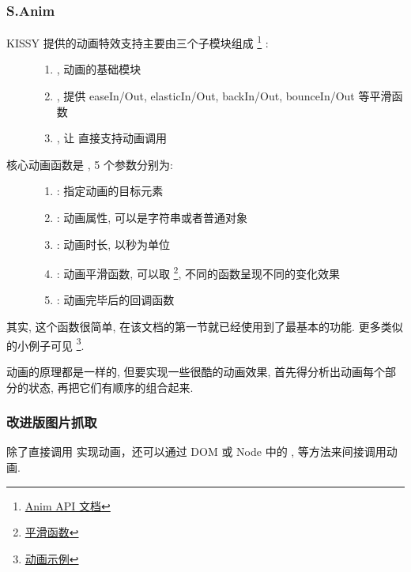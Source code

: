 \documentclass[letterpaper,10pt,english]{sphinxmanual}
\begin{document}
\subsubsection{S.Anim}
\label{quickstart/anim:s-anim}\begin{description}
\item[{KISSY 提供的动画特效支持主要由三个子模块组成 \footnote{
\href{http://kissyteam.github.com/kissy/docs/anim/}{Anim API 文档}
} :}] \leavevmode\begin{enumerate}
\item {}
, 动画的基础模块

\item {}
, 提供 easeIn/Out, elasticIn/Out, backIn/Out, bounceIn/Out 等平滑函数

\item {}
, 让  直接支持动画调用

\end{enumerate}

\item[{核心动画函数是  , 5 个参数分别为:}] \leavevmode\begin{enumerate}
\item {}
: 指定动画的目标元素

\item {}
: 动画属性, 可以是字符串或者普通对象

\item {}
: 动画时长, 以秒为单位

\item {}
: 动画平滑函数, 可以取 \footnote{
\href{http://kissyteam.github.com/kissy/docs/anim/anim-easing.html}{平滑函数}
}, 不同的函数呈现不同的变化效果

\item {}
: 动画完毕后的回调函数

\end{enumerate}

\end{description}

其实, 这个函数很简单, 在该文档的第一节就已经使用到了最基本的功能. 更多类似的小例子可见 \footnote{
\href{http://kissyteam.github.com/kissy/src/anim/demo.html}{动画示例}
}.

动画的原理都是一样的, 但要实现一些很酷的动画效果, 首先得分析出动画每个部分的状态, 再把它们有顺序的组合起来.


\subsubsection{改进版图片抓取}
\label{quickstart/anim:id5}
除了直接调用  实现动画，还可以通过 DOM 或 Node 中的 ,  等方法来间接调用动画.
\end{document}
